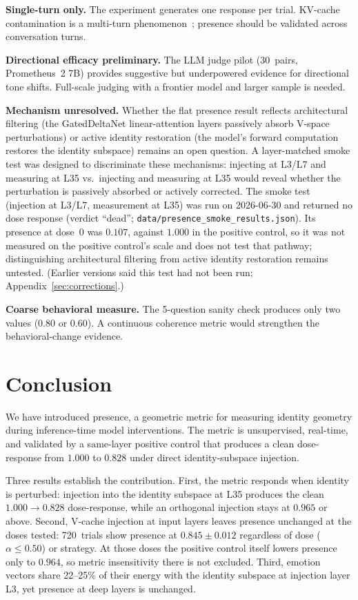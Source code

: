 \documentclass[11pt,a4paper]{article}
\begin{document}
\textbf{Single-turn only.} The experiment generates one response per trial.
KV-cache contamination is a multi-turn
phenomenon~\citep{kang2026promptactivation}; presence should be validated
across conversation turns.

\textbf{Directional efficacy preliminary.} The LLM judge pilot (30~pairs,
Prometheus~2 7B) provides suggestive but underpowered evidence for
directional tone shifts. Full-scale judging with a frontier model and
larger sample is needed.

\textbf{Mechanism unresolved.}
Whether the flat presence result reflects architectural filtering (the
GatedDeltaNet linear-attention layers passively absorb V-space
perturbations) or active identity restoration (the model's forward
computation restores the identity subspace) remains an open question.
A layer-matched smoke test was designed to discriminate these mechanisms:
injecting at L3/L7 and measuring at L35 vs.\ injecting and measuring at
L35 would reveal whether the perturbation is passively absorbed or
actively corrected. The smoke test (injection at L3/L7, measurement at
L35) was run on 2026-06-30 and returned no dose response (verdict
``dead''; \texttt{data/presence\_smoke\_results.json}). Its presence at
dose~0 was $0.107$, against $1.000$ in the positive control, so it was
not measured on the positive control's scale and does not test that
pathway; distinguishing architectural filtering from active identity
restoration remains untested. (Earlier versions said this test had not
been run; Appendix~\ref{sec:corrections}.)

\textbf{Coarse behavioral measure.} The 5-question sanity check produces
only two values (0.80 or 0.60). A continuous coherence metric would
strengthen the behavioral-change evidence.

\section{Conclusion}
\label{sec:conclusion}

We have introduced presence, a geometric metric for measuring identity
geometry during inference-time model interventions. The metric is
unsupervised, real-time, and validated by a same-layer positive control
that produces a clean dose-response from $1.000$ to $0.828$ under direct
identity-subspace injection.

Three results establish the contribution. First, the metric responds
when identity is perturbed: injection into the identity subspace at L35
produces the clean $1.000 \to 0.828$ dose-response, while an orthogonal
injection stays at $0.965$ or above. Second, V-cache injection at input
layers leaves presence unchanged at the doses tested: 720~trials show
presence at $0.845 \pm 0.012$ regardless of dose ($\alpha \le 0.50$) or
strategy. At those doses the positive control itself lowers presence
only to $0.964$, so metric insensitivity there is not excluded. Third,
emotion vectors share 22--25\% of their energy with the identity subspace
at injection layer L3, yet presence at deep layers is unchanged.
\end{document}
